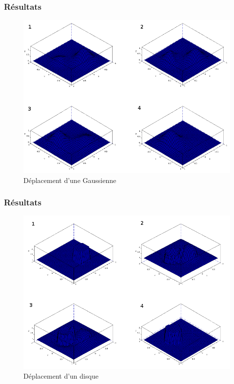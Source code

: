\documentclass[10pt]{beamer}
\begin{document}
    \begin{frame}
    \frametitle{Résultats}
    \begin{figure}
    \begin{center}
    \includegraphics[scale=0.3]{depl1.png}
    \caption{Déplacement d'une Gaussienne}
    \end{center}
    \end{figure}

    \end{frame}

    \begin{frame}
    \frametitle{Résultats}
    \begin{figure}
    \begin{center}
    \includegraphics[scale=0.3]{depl2.png}
    \caption{Déplacement d'un disque}
    \end{center}
    \end{figure}
    \end{frame}
\end{document}
